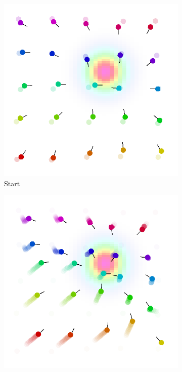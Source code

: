 \documentclass[conference]{IEEEtran}
\begin{document}
\begin{figure}[t]
  \centering
  \begin{subfigure}[b]{0.32\linewidth}
      \includegraphics[width=\textwidth]{imgs/start.png}
      \caption{Start}
      \label{fig:initial}
  \end{subfigure}
  \begin{subfigure}[b]{0.32\linewidth}
      \includegraphics[width=\textwidth]{imgs/after.png}

\end{subfigure}
\end{figure}
\end{document}
